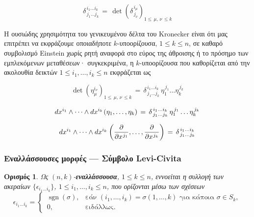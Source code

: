 \documentclass[11pt,a4paper,twoside,openright]{book}
\newtheorem{definition}[lemma]{Ορισμός}
\begin{document}
\begin{equation}\label{eq:kronecker-determinant}
\delta^{\,i_1 \dots i_k}_{\,j_1 \dots j_k}
\,
=
\,
\operatorname{det}\left(\delta^{\,i_\mu}_{\,j_\nu}\right)_{1 \le \,\mu,\,\nu\, \le k}
\end{equation}

\noindent
Η ουσιώδης χρησιμότητα του γενικευμένου δέλτα του Kronecker είναι ότι μας επιτρέπει να εκφράζουμε οποιαδήποτε $k$-υποορίζουσα, $1 \le k \le n$, σε καθαρό συμβολισμό Einstein χωρίς ρητή αναφορά στο εύρος της άθροισης ή το πρόσημο των εμπλεκόμενων μεταθέσεων· συγκεκριμένα, η $k$-υποορίζουσα που καθορίζεται από την ακολουθία δεικτών $1 \le i_1, \dots, i_k \le n$
εκφράζεται ως

\begin{equation}\label{eq:kronecker-essential}
\det \left(\eta_\mu^{i_\nu}\right)_{1 \le\, \mu,\,\nu\, \le k}
\,
=
\,
\delta^{\,i_1 \dots i_k}_{\,j_1 \dots j_k}
\,
\eta_1^{\,j_1} \dots \eta_k^{\,j_k}
\end{equation}

\begin{equation}\label{eq:kronecker-expansion}
dx^{i_1} \wedge \dots \wedge dx^{i_k} \hspace{.7pt}
(\eta_1, \dots, \eta_k)
\,
=
\,
\delta^{\,i_1 \dots i_k}_{\,j_1 \dots j_k}
\,
\eta_1^{\,j_1} \dots \eta_k^{\,j_k}
\end{equation}

\begin{equation}\label{eq:kronecker-expansion-elementary}
dx^{i_1} \wedge \dots \wedge dx^{i_k} \hspace{.5pt}
\left(\frac{\partial}{\partial x^{\hspace{.5pt}j_1}}, \dots, \frac{\partial}{\partial x^{\hspace{.5pt}j_k}}\right)
\,
=
\,
\delta^{\,i_1 \dots i_k}_{\,j_1 \dots j_k} 
\end{equation}

\subsubsection{Εναλλάσσουσες μορφές --- Σύμβολο Levi-Civita}
	\label{sec:alternators}

\begin{definition}
	\label{def:alternator}
Ως $(n, k)$-\textbf{εναλλάσσουσα}, $1 \le k \le n$, εννοείται η συλλογή των ακεραίων
$\{\epsilon_{i_1 \dots i_k}\}$, $1 \le i_1, \dots, i_k \le n$,
που ορίζονται μέσω των σχέσεων
\begin{equation}\label{eq:alternator-components}
\epsilon_{i_1 \dots i_k} =
\begin{cases}
\,\operatorname{sgn}(\sigma), & \text{εάν } (i_1, \dots, i_k)=\sigma(1, \dots, k) \text{ για κάποια } \sigma \in S_k, \\
\,0, & \text{ειδάλλως}.
\end{cases}
\end{equation}
\end{definition}
\end{document}
